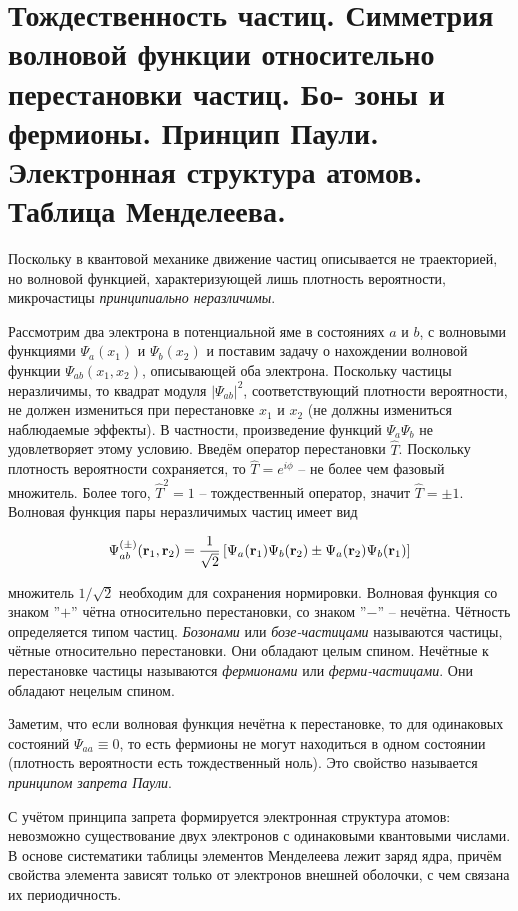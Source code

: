 \section{Тождественность частиц. Симметрия волновой функции относительно перестановки частиц. Бо-
зоны и фермионы. Принцип Паули. Электронная структура атомов. Таблица Менделеева.}

Поскольку в квантовой механике движение частиц описывается не траекторией, но волновой функцией, характеризующей лишь плотность вероятности, микрочастицы \textit{принципиально неразличимы}.

Рассмотрим два электрона в потенциальной яме в состояниях $a$ и $b$, с волновыми функциями $\Psi_a (x_1)$ и $\Psi_b (x_2)$ и поставим задачу о нахождении волновой функции $\Psi_{a b} (x_1, x_2)$, описывающей оба электрона. Поскольку частицы неразличимы, то квадрат модуля $\left| \Psi_{a b} \right|^2$, соответствующий плотности вероятности, не должен измениться при перестановке $x_1$ и $x_2$ (не должны измениться наблюдаемые эффекты). В частности, произведение функций $\Psi_a \Psi_b$ не удовлетворяет этому условию. Введём оператор перестановки $\hat{T}$. Поскольку плотность вероятности сохраняется, то $\hat{T} = e^{i \phi}$ -- не более чем фазовый множитель. Более того, $\hat{T}^2 = 1$ -- тождественный оператор, значит $\hat{T} = \pm 1$. Волновая функция пары неразличимых частиц имеет вид

\begin{equation}
    \Psi_{a b}^{(\pm)} (\mathbf r_1, \mathbf r_2) = \frac{1}{\sqrt{2}} \left[ \Psi_a (\mathbf r_1) \Psi_b (\mathbf r_2) \pm \Psi_a (\mathbf r_2) \Psi_b (\mathbf r_1) \right]
\end{equation}

\noindent
множитель $1 / \sqrt{2}$ необходим для сохранения нормировки. Волновая функция со знаком ''$+$'' чётна относительно перестановки, со знаком ''$-$'' -- нечётна. Чётность определяется типом частиц. \textit{Бозонами} или \textit{бозе-частицами} называются частицы, чётные относительно перестановки. Они обладают целым спином. Нечётные к перестановке частицы называются \textit{фермионами} или \textit{ферми-частицами}. Они обладают нецелым спином.

Заметим, что если волновая функция нечётна к перестановке, то для одинаковых состояний $\Psi_{a a} \equiv 0$, то есть фермионы не могут находиться в одном состоянии (плотность вероятности есть тождественный ноль). Это свойство называется \textit{принципом запрета Паули}.

С учётом принципа запрета формируется электронная структура атомов: невозможно существование двух электронов с одинаковыми квантовыми числами. В основе систематики таблицы элементов Менделеева лежит заряд ядра, причём свойства элемента зависят только от электронов внешней оболочки, с чем связана их периодичность.